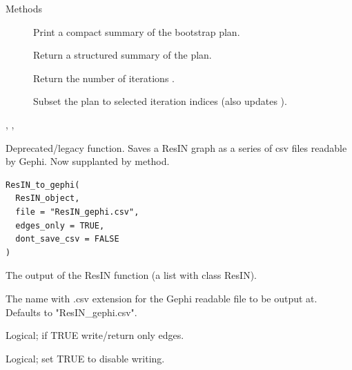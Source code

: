 \documentclass[a4paper]{book}
\begin{document}
%
\begin{Section}{Methods}

\begin{description}

\item[] Print a compact summary of the bootstrap plan.
\item[] Return a structured summary of the plan.
\item[] Return the number of iterations .
\item[] Subset the plan to selected iteration indices (also updates ).

\end{description}

\end{Section}
%
\begin{SeeAlso}
, ,
\end{SeeAlso}
%
\begin{Description}
Deprecated/legacy function. Saves a ResIN graph as a series of csv files readable by Gephi. Now supplanted by  method.
\end{Description}
%
\begin{Usage}
\begin{verbatim}
ResIN_to_gephi(
  ResIN_object,
  file = "ResIN_gephi.csv",
  edges_only = TRUE,
  dont_save_csv = FALSE
)
\end{verbatim}
\end{Usage}
%
\begin{Arguments}
\begin{ldescription}
\item[\code{ResIN\_object}] The output of the ResIN function (a list with class ResIN).

\item[\code{file}] The name with .csv extension for the Gephi readable file to be output at. Defaults to "ResIN\_gephi.csv".

\item[\code{edges\_only}] Logical; if TRUE write/return only edges.

\item[\code{dont\_save\_csv}] Logical; set TRUE to disable writing.
\end{ldescription}
\end{Arguments}
\end{document}
